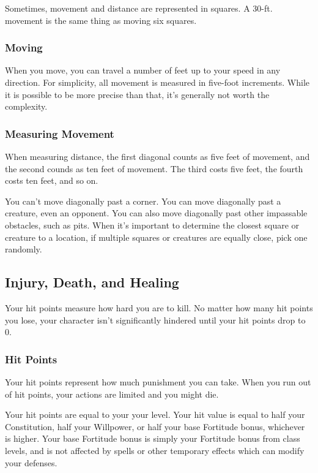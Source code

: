 Sometimes, movement and distance are represented in squares. A 30-ft. movement is the same thing as moving six squares.

\subsubsection{Moving}

When you move, you can travel a number of feet up to your speed in any direction. For simplicity, all movement is measured in five-foot increments. While it is possible to be more precise than that, it's generally not worth the complexity.

\subsubsection{Measuring Movement}

 When measuring distance, the first diagonal counts as five feet of movement, and the second counds as ten feet of movement. The third costs five feet, the fourth costs ten feet, and so on.

You can't move diagonally past a corner. You can move diagonally past a creature, even an opponent. You can also move diagonally past other impassable obstacles, such as pits.
 When it's important to determine the closest square or creature to a location, if multiple squares or creatures are equally close, pick one randomly.

\subsection{Injury, Death, and Healing}\label{Injury, Death, and Healing}
Your hit points measure how hard you are to kill. No matter how many hit points you lose, your character isn't significantly hindered until your hit points drop to 0.

\subsubsection{Hit Points}
Your hit points represent how much punishment you can take. When you run out of hit points, your actions are limited and you might die.

Your hit points are equal to your  \mtimes your level. Your hit value is equal to half your Constitution, half your Willpower, or half your base Fortitude bonus, whichever is higher. Your base Fortitude bonus is simply your Fortitude bonus from class levels, and is not affected by spells or other temporary effects which can modify your defenses.

